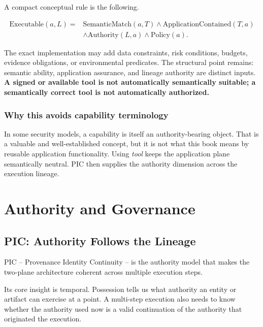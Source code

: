 \documentclass[10pt,oneside,openany]{book}
\begin{document}
A compact conceptual rule is the following.
\begin{formulabox}
\[
\begin{aligned}
\mathrm{Executable}(a,L)={}&\mathrm{SemanticMatch}(a,T)
\land \mathrm{ApplicationContained}(T,a)\\
&\land \mathrm{Authority}(L,a)
\land \mathrm{Policy}(a).
\end{aligned}
\]
\end{formulabox}
The exact implementation may add data constraints, risk conditions, budgets, evidence obligations, or environmental predicates. The structural point remains: semantic ability, application assurance, and lineage authority are distinct inputs. \textbf{A signed or available tool is not automatically semantically suitable; a semantically correct tool is not automatically authorized.}

\section{Why this avoids capability terminology}
In some security models, a capability is itself an authority-bearing object. That is a valuable and well-established concept, but it is not what this book means by reusable application functionality. Using \emph{tool} keeps the application plane semantically neutral. PIC then supplies the authority dimension across the execution lineage.

\part{Authority and Governance}

\chapter{PIC: Authority Follows the Lineage}

PIC -- Provenance Identity Continuity -- is the authority model that makes the two-plane architecture coherent across multiple execution steps.

Its core insight is temporal. Possession tells us what authority an entity or artifact can exercise at a point. A multi-step execution also needs to know whether the authority used now is a valid continuation of the authority that originated the execution.
\end{document}

